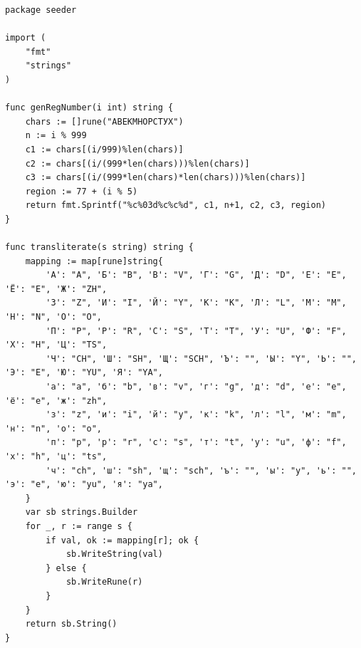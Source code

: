 \begin{lstlisting}[style=gostyle, caption={Вспомогательные функции (internal/seeder/utils.go)}, label={lst:goUtils}]
package seeder

import (
	"fmt"
	"strings"
)

func genRegNumber(i int) string {
	chars := []rune("АВЕКМНОРСТУХ")
	n := i % 999
	c1 := chars[(i/999)%len(chars)]
	c2 := chars[(i/(999*len(chars)))%len(chars)]
	c3 := chars[(i/(999*len(chars)*len(chars)))%len(chars)]
	region := 77 + (i % 5)
	return fmt.Sprintf("%c%03d%c%c%d", c1, n+1, c2, c3, region)
}

func transliterate(s string) string {
	mapping := map[rune]string{
		'А': "A", 'Б': "B", 'В': "V", 'Г': "G", 'Д': "D", 'Е': "E", 'Ё': "E", 'Ж': "ZH",
		'З': "Z", 'И': "I", 'Й': "Y", 'К': "K", 'Л': "L", 'М': "M", 'Н': "N", 'О': "O",
		'П': "P", 'Р': "R", 'С': "S", 'Т': "T", 'У': "U", 'Ф': "F", 'Х': "H", 'Ц': "TS",
		'Ч': "CH", 'Ш': "SH", 'Щ': "SCH", 'Ъ': "", 'Ы': "Y", 'Ь': "", 'Э': "E", 'Ю': "YU", 'Я': "YA",
		'а': "a", 'б': "b", 'в': "v", 'г': "g", 'д': "d", 'е': "e", 'ё': "e", 'ж': "zh",
		'з': "z", 'и': "i", 'й': "y", 'к': "k", 'л': "l", 'м': "m", 'н': "n", 'о': "o",
		'п': "p", 'р': "r", 'с': "s", 'т': "t", 'у': "u", 'ф': "f", 'х': "h", 'ц': "ts",
		'ч': "ch", 'ш': "sh", 'щ': "sch", 'ъ': "", 'ы': "y", 'ь': "", 'э': "e", 'ю': "yu", 'я': "ya",
	}
	var sb strings.Builder
	for _, r := range s {
		if val, ok := mapping[r]; ok {
			sb.WriteString(val)
		} else {
			sb.WriteRune(r)
		}
	}
	return sb.String()
}
\end{lstlisting}
\newpage

